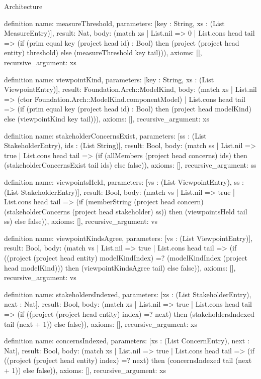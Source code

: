 \begin{lexlean}{Architecture}
\begin{semanticmodule}
definition{
  name: measureThreshold,
  parameters: [key : String, xs : (List MeasureEntry)],
  result: Nat,
  body: (match xs
    | List.nil => 0
    | List.cons head tail => (if (prim equal key (project head id) : Bool) then (project (project head entity) threshold) else (measureThreshold key tail))),
  axioms: [],
  recursive_argument: xs
}

definition{
  name: viewpointKind,
  parameters: [key : String, xs : (List ViewpointEntry)],
  result: Foundation.Arch::ModelKind,
  body: (match xs
    | List.nil => (ctor Foundation.Arch::ModelKind.componentModel)
    | List.cons head tail => (if (prim equal key (project head id) : Bool) then (project head modelKind) else (viewpointKind key tail))),
  axioms: [],
  recursive_argument: xs
}

definition{
  name: stakeholderConcernsExist,
  parameters: [ss : (List StakeholderEntry), ids : (List String)],
  result: Bool,
  body: (match ss
    | List.nil => true
    | List.cons head tail => (if (allMembers (project head concerns) ids) then (stakeholderConcernsExist tail ids) else false)),
  axioms: [],
  recursive_argument: ss
}

definition{
  name: viewpointsHeld,
  parameters: [vs : (List ViewpointEntry), ss : (List StakeholderEntry)],
  result: Bool,
  body: (match vs
    | List.nil => true
    | List.cons head tail => (if (memberString (project head concern) (stakeholderConcerns (project head stakeholder) ss)) then (viewpointsHeld tail ss) else false)),
  axioms: [],
  recursive_argument: vs
}

definition{
  name: viewpointKindsAgree,
  parameters: [vs : (List ViewpointEntry)],
  result: Bool,
  body: (match vs
    | List.nil => true
    | List.cons head tail => (if ((project (project head entity) modelKindIndex) =? (modelKindIndex (project head modelKind))) then (viewpointKindsAgree tail) else false)),
  axioms: [],
  recursive_argument: vs
}

definition{
  name: stakeholdersIndexed,
  parameters: [xs : (List StakeholderEntry), next : Nat],
  result: Bool,
  body: (match xs
    | List.nil => true
    | List.cons head tail => (if ((project (project head entity) index) =? next) then (stakeholdersIndexed tail (next + 1)) else false)),
  axioms: [],
  recursive_argument: xs
}

definition{
  name: concernsIndexed,
  parameters: [xs : (List ConcernEntry), next : Nat],
  result: Bool,
  body: (match xs
    | List.nil => true
    | List.cons head tail => (if ((project (project head entity) index) =? next) then (concernsIndexed tail (next + 1)) else false)),
  axioms: [],
  recursive_argument: xs
}


\end{semanticmodule}
\end{lexlean}

